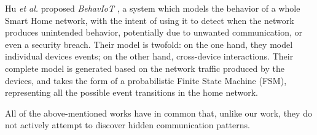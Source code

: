 
Hu \textit{et al.} proposed \emph{BehavIoT} \cite{behaviot},
a system which models the behavior of a whole Smart Home network,
with the intent of using it to detect when the network produces unintended behavior,
potentially due to unwanted communication, or even a security breach.
Their model is twofold:
on the one hand, they model individual devices events;
on the other hand, cross-device interactions.
Their complete model is generated based on the network traffic produced by the devices,
and takes the form of a probabilistic Finite State Machine (FSM),
representing all the possible event transitions in the home network.


All of the above-mentioned works have in common that, unlike our work, they do not actively attempt to discover hidden communication patterns.





